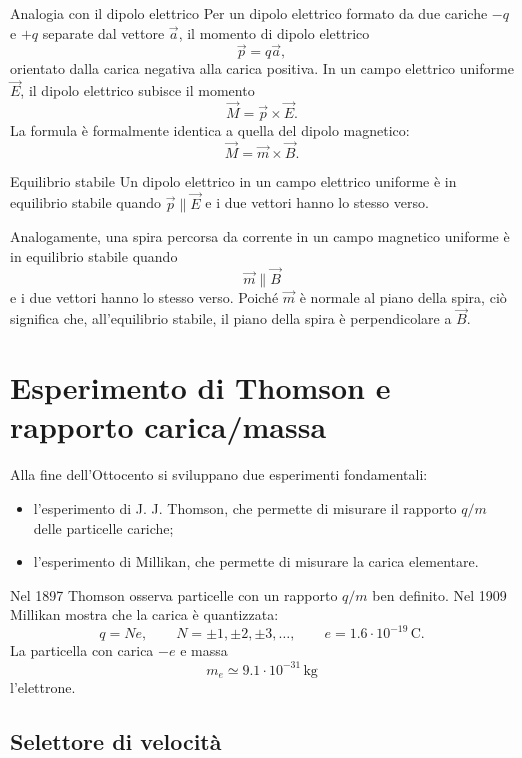 \documentclass[a4paper]{article}
\begin{document}
\begin{snippetexample}{Analogia con il dipolo elettrico}
    Per un dipolo elettrico formato da due cariche \(-q\) e \(+q\) separate dal vettore \(\vec{a}\), il momento di dipolo elettrico
    \[
        \vec{p}=q\vec{a},
    \]
    orientato dalla carica negativa alla carica positiva. In un campo elettrico uniforme \(\vec{E}\), il dipolo elettrico subisce il momento
    \[
        \vec{M}=\vec{p}\times\vec{E}.
    \]
    La formula è formalmente identica a quella del dipolo magnetico:
    \[
        \vec{M}=\vec{m}\times\vec{B}.
    \]
\end{snippetexample}

\begin{snippetproposition}{Equilibrio stabile}
    Un dipolo elettrico in un campo elettrico uniforme è in equilibrio stabile quando \(\vec{p}\parallel\vec{E}\) e i due vettori hanno lo stesso verso.

    Analogamente, una spira percorsa da corrente in un campo magnetico uniforme è in equilibrio stabile quando
    \[
        \vec{m}\parallel\vec{B}
    \]
    e i due vettori hanno lo stesso verso. Poiché \(\vec{m}\) è normale al piano della spira, ciò significa che, all'equilibrio stabile, il piano della spira è perpendicolare a \(\vec{B}\).
\end{snippetproposition}

\section{Esperimento di Thomson e rapporto carica/massa}

Alla fine dell'Ottocento si sviluppano due esperimenti fondamentali:
\begin{itemize}
    \item l'esperimento di J. J. Thomson, che permette di misurare il rapporto \(q/m\) delle particelle cariche;
    \item l'esperimento di Millikan, che permette di misurare la carica elementare.
\end{itemize}

Nel 1897 Thomson osserva particelle con un rapporto \(q/m\) ben definito. Nel 1909 Millikan mostra che la carica è quantizzata:
\[
    q=Ne,
    \qquad
    N=\pm1,\pm2,\pm3,\ldots,
    \qquad
    e=1.6\cdot10^{-19}\,\text{C}.
\]
La particella con carica \(-e\) e massa
\[
    m_e\simeq 9.1\cdot10^{-31}\,\text{kg}
\]
l'elettrone.

\subsection{Selettore di velocità}
\end{document}

